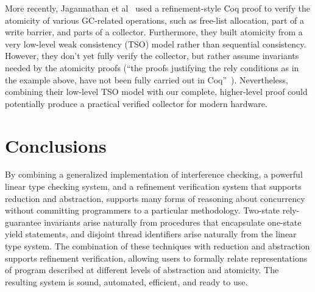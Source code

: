 More recently,
Jagannathan et al~\cite{Jagannathan14} used a refinement-style Coq proof to verify the atomicity of various GC-related operations,
such as free-list allocation,
part of a write barrier, and parts of a collector.
Furthermore, they built atomicity from a very low-level weak consistency (TSO) model rather than sequential consistency.
However, they don't yet fully verify the collector,
but rather assume invariants needed by the atomicity proofs
(``the proofs justifying the rely conditions as in the example above,
have not been fully carried out in Coq''~\cite{Jagannathan14}).
Nevertheless, combining their low-level TSO model with our complete,
higher-level proof could potentially produce a practical verified collector for modern hardware.

\section{Conclusions}

By combining a generalized implementation of interference checking, a powerful linear type checking system, and a refinement verification system that supports reduction and abstraction, 
\civl supports many forms of reasoning about concurrency without committing programmers to a particular methodology.
Two-state rely-guarantee invariants arise naturally from procedures that encapsulate one-state yield statements,
and disjoint thread identifiers arise naturally from the linear type system. The combination of these techniques with reduction and abstraction supports refinement verification, allowing users to formally relate representations of program described at different levels of abstraction and atomicity. 
The resulting system is sound, automated, efficient, and ready to use.

